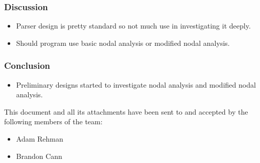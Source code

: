 \documentclass[a4paper]{article}
\begin{document}
\subsubsection{Discussion}
\begin{itemize}
    \item Parser design is pretty standard so not much use in investigating it deeply.
    \item Should program use basic nodal analysis or modified nodal analysis.
\end{itemize}
\subsubsection{Conclusion}
\begin{itemize}
    \item Preliminary designs started to investigate nodal analysis and modified nodal analysis.
\end{itemize}




\vspace*{\fill}
\begin{center}
This document and all its attachments have been sent to and accepted by the following members of the team:
\begin{itemize}
\item Adam Rehman
\item Brandon Cann
\end{itemize}
\end{center}
\end{document}
